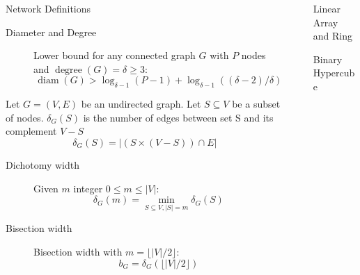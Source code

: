 \documentclass[final]{beamer}
\newlength{\sepwidth}
\newlength{\colwidth}
\newcommand{\separatorcolumn}{\begin{column}{\sepwidth}\end{column}}
\begin{document}
\begin{frame}[t]
\begin{columns}[t]
\begin{column}{\colwidth}
\begin{block}{Network Definitions}
                    \begin{description}
                        \item[Diameter and Degree]  Lower bound for any connected graph \(G\) with \(P\) nodes and \(\operatorname{degree}(G) = \delta \geq 3\):
                        \begin{equation*}
                            \operatorname { diam } ( G ) > \log _ { \delta - 1 } ( P - 1 ) + \log _ { \delta - 1 } ( ( \delta - 2 ) / \delta ) 
                        \end{equation*}
                    \end{description}

                
                    
                    Let \(G = (V,E)\) be an undirected graph. Let \(S \subseteq V\) be a subset of nodes. 
                    \(\delta_{G}(S)\) is the number of edges between set S and its complement \(V - S\)
                    \begin{equation*}
                        \delta_{G}(S)=|(S \times(V-S)) \cap E|
                    \end{equation*}

                    \begin{description}
                        \item[Dichotomy width] Given \(m\) integer \(0 \leq m \leq|V| \):
                        \begin{equation*}
                            \delta_{G}(m)=\min_{S \subseteq V,|S|=m} \delta_{G}(S)
                        \end{equation*}
                        \item[Bisection width] Bisection width with \(m=\lfloor|V| / 2\rfloor\):
                        \begin{equation*}
                            b_{G}=\delta_{G}(\lfloor|V| / 2\rfloor)
                        \end{equation*}
                    \end{description}

                \end{block}
            \end{column}
            \separatorcolumn
            \begin{column}{\colwidth}
                \begin{block}{Linear Array and Ring}
                \end{block}
                \begin{block}{Binary Hypercube}
                    

\end{block}
\end{column}
\end{columns}
\end{frame}
\end{document}
